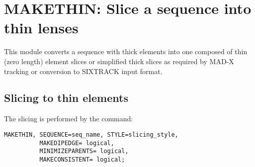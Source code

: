  
\chapter{MAKETHIN: Slice a sequence into thin lenses}
\label{chap:makethin}

This module converts a sequence with thick elements into one composed of
thin (zero length) element slices or simplified thick slices as required
by MAD-X tracking or conversion to SIXTRACK input format.

\section{Slicing to thin elements}

The slicing is performed by the command: 
\begin{verbatim}
MAKETHIN, SEQUENCE=seq_name, STYLE=slicing_style,
          MAKEDIPEDGE= logical, 
          MINIMIZEPARENTS= logical, 
          MAKECONSISTENT= logical; 
\end{verbatim} 

